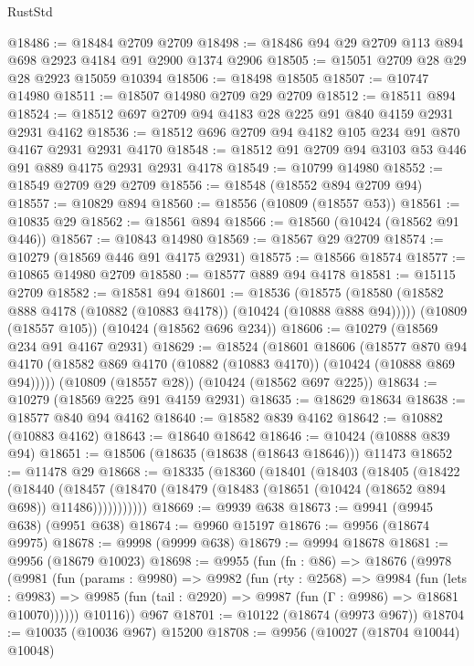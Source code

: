 \begin{lexlean}{RustStd}
\begin{coremodule}
@18486 := @18484 @2709 @2709
@18498 := @18486 @94 @29 @2709 @113 @894 @698 @2923 @4184 @91 @2900 @1374 @2906
@18505 := @15051 @2709 @28 @29 @28 @2923 @15059 @10394
@18506 := @18498 @18505
@18507 := @10747 @14980
@18511 := @18507 @14980 @2709 @29 @2709
@18512 := @18511 @894
@18524 := @18512 @697 @2709 @94 @4183 @28 @225 @91 @840 @4159 @2931 @2931 @4162
@18536 := @18512 @696 @2709 @94 @4182 @105 @234 @91 @870 @4167 @2931 @2931 @4170
@18548 := @18512 @91 @2709 @94 @3103 @53 @446 @91 @889 @4175 @2931 @2931 @4178
@18549 := @10799 @14980
@18552 := @18549 @2709 @29 @2709
@18556 := @18548 (@18552 @894 @2709 @94)
@18557 := @10829 @894
@18560 := @18556 (@10809 (@18557 @53))
@18561 := @10835 @29
@18562 := @18561 @894
@18566 := @18560 (@10424 (@18562 @91 @446))
@18567 := @10843 @14980
@18569 := @18567 @29 @2709
@18574 := @10279 (@18569 @446 @91 @4175 @2931)
@18575 := @18566 @18574
@18577 := @10865 @14980 @2709
@18580 := @18577 @889 @94 @4178
@18581 := @15115 @2709
@18582 := @18581 @94
@18601 := @18536
    (@18575 (@18580 (@18582 @888 @4178 (@10882 (@10883 @4178)) (@10424 (@10888 @888 @94)))))
    (@10809 (@18557 @105))
    (@10424 (@18562 @696 @234))
@18606 := @10279 (@18569 @234 @91 @4167 @2931)
@18629 := @18524
    (@18601
      @18606
      (@18577
        @870
        @94
        @4170
        (@18582 @869 @4170 (@10882 (@10883 @4170)) (@10424 (@10888 @869 @94)))))
    (@10809 (@18557 @28))
    (@10424 (@18562 @697 @225))
@18634 := @10279 (@18569 @225 @91 @4159 @2931)
@18635 := @18629 @18634
@18638 := @18577 @840 @94 @4162
@18640 := @18582 @839 @4162
@18642 := @10882 (@10883 @4162)
@18643 := @18640 @18642
@18646 := @10424 (@10888 @839 @94)
@18651 := @18506 (@18635 (@18638 (@18643 @18646))) @11473
@18652 := @11478 @29
@18668 := @18335
    (@18360
      (@18401
        (@18403
          (@18405
            (@18422
              (@18440
                (@18457
                  (@18470 (@18479 (@18483 (@18651 (@10424 (@18652 @894 @698)) @11486)))))))))))
@18669 := @9939 @638
@18673 := @9941 (@9945 @638) (@9951 @638)
@18674 := @9960 @15197
@18676 := @9956 (@18674 @9975)
@18678 := @9998 (@9999 @638)
@18679 := @9994 @18678
@18681 := @9956 (@18679 @10023)
@18698 := @9955
    (fun (fn : @86) =>
    @18676
      (@9978
        (@9981
          (fun (params : @9980) =>
          @9982
            (fun (rty : @2568) =>
            @9984
              (fun (lets : @9983) =>
              @9985 (fun (tail : @2920) => @9987 (fun (Γ : @9986) => @18681 @10070))))))
        @10116))
    @967
@18701 := @10122 (@18674 (@9973 @967))
@18704 := @10035 (@10036 @967) @15200
@18708 := @9956 (@10027 (@18704 @10044) @10048)

\end{coremodule}
\end{lexlean}
